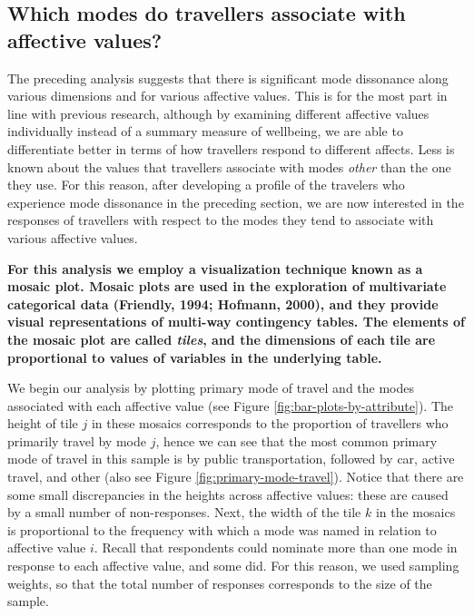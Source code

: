 \documentclass[]{elsarticle} %
\begin{document}
\hypertarget{which-modes-do-travellers-associate-with-affective-values}{%
\subsection{Which modes do travellers associate with affective
values?}\label{which-modes-do-travellers-associate-with-affective-values}}

The preceding analysis suggests that there is significant mode
dissonance along various dimensions and for various affective values.
This is for the most part in line with previous research, although by
examining different affective values individually instead of a summary
measure of wellbeing, we are able to differentiate better in terms of
how travellers respond to different affects. Less is known about the
values that travellers associate with modes \emph{other} than the one
they use. For this reason, after developing a profile of the travelers
who experience mode dissonance in the preceding section, we are now
interested in the responses of travellers with respect to the modes they
tend to associate with various affective values.

\textbf{\textbf{For this analysis we employ a visualization technique
known as a mosaic plot. Mosaic plots are used in the exploration of
multivariate categorical data (Friendly, 1994; Hofmann, 2000), and they
provide visual representations of multi-way contingency tables. The
elements of the mosaic plot are called \emph{tiles}, and the dimensions
of each tile are proportional to values of variables in the underlying
table.}}

We begin our analysis by plotting primary mode of travel and the modes
associated with each affective value (see Figure
\ref{fig:bar-plots-by-attribute}). The height of tile \(j\) in these
mosaics corresponds to the proportion of travellers who primarily travel
by mode \(j\), hence we can see that the most common primary mode of
travel in this sample is by public transportation, followed by car,
active travel, and other (also see Figure
\ref{fig:primary-mode-travel}). Notice that there are some small
discrepancies in the heights across affective values: these are caused
by a small number of non-responses. Next, the width of the tile \(k\) in
the mosaics is proportional to the frequency with which a mode was named
in relation to affective value \(i\). Recall that respondents could
nominate more than one mode in response to each affective value, and
some did. For this reason, we used sampling weights, so that the total
number of responses corresponds to the size of the sample.
\end{document}
